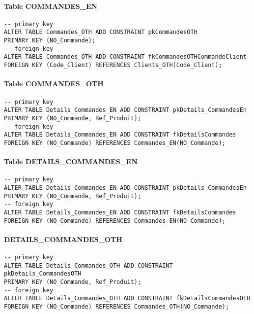 \documentclass[10pt,a4paper,twoside]{article}
\begin{document}
\paragraph{Table COMMANDES\_EN}
\begin{verbatim}
-- primary key
ALTER TABLE Commandes_OTH ADD CONSTRAINT pkCommandesOTH 
PRIMARY KEY (NO_Commande);
-- foreign key
ALTER TABLE Commandes_OTH ADD CONSTRAINT fkCommandesOTHCommandeClient 
FOREIGN KEY (Code_Client) REFERENCES Clients_OTH(Code_Client);
\end{verbatim}

\paragraph{Table COMMANDES\_OTH}
\begin{verbatim}
-- primary key
ALTER TABLE Details_Commandes_EN ADD CONSTRAINT pkDetails_CommandesEn 
PRIMARY KEY (NO_Commande, Ref_Produit);
-- foreign key
ALTER TABLE Details_Commandes_EN ADD CONSTRAINT fkDetailsCommandes 
FOREIGN KEY (NO_Commande) REFERENCES Commandes_EN(NO_Commande);
\end{verbatim}

\paragraph{Table DETAILS\_COMMANDES\_EN}
\begin{verbatim}
-- primary key
ALTER TABLE Details_Commandes_EN ADD CONSTRAINT pkDetails_CommandesEn 
PRIMARY KEY (NO_Commande, Ref_Produit);
-- foreign key
ALTER TABLE Details_Commandes_EN ADD CONSTRAINT fkDetailsCommandes FOREIGN KEY (NO_Commande) REFERENCES Commandes_EN(NO_Commande);
\end{verbatim}

\paragraph{DETAILS\_COMMANDES\_OTH}
\begin{verbatim}
-- primary key
ALTER TABLE Details_Commandes_OTH ADD CONSTRAINT pkDetails_CommandesOTH 
PRIMARY KEY (NO_Commande, Ref_Produit);
-- foreign key
ALTER TABLE Details_Commandes_OTH ADD CONSTRAINT fkDetailsCommandesOTH 
FOREIGN KEY (NO_Commande) REFERENCES Commandes_OTH(NO_Commande);
\end{verbatim}
\end{document}
